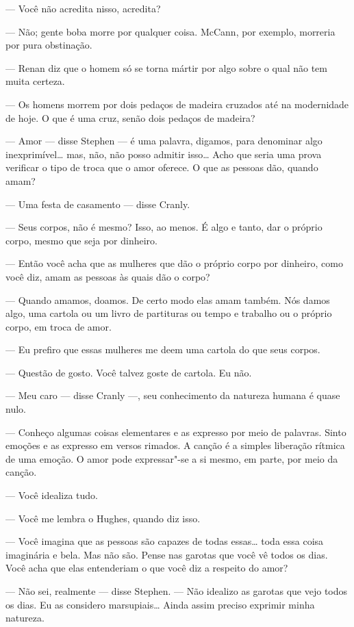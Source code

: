--- Você não acredita nisso, acredita?

--- Não; gente boba morre por qualquer coisa.  McCann, por exemplo, morreria
por pura obstinação.

--- Renan diz que o homem só se torna mártir por algo sobre o qual não tem
muita certeza.

--- Os homens morrem por dois pedaços de madeira cruzados até na modernidade de
hoje.  O que é uma cruz, senão dois pedaços de madeira?

--- Amor --- disse Stephen --- é uma palavra, digamos, para denominar algo
inexprimível\ldots{} mas, não, não posso admitir isso\ldots{}  Acho que seria uma prova
verificar o tipo de troca que o amor oferece.  O que as pessoas dão, quando
amam?

--- Uma festa de casamento --- disse Cranly.

--- Seus corpos, não é mesmo?  Isso, ao menos.  É algo e tanto, dar o próprio		
corpo, mesmo que seja por dinheiro.

--- Então você acha que as mulheres que dão o próprio corpo por dinheiro, como
você diz, amam as pessoas às quais dão o corpo?

--- Quando amamos, doamos.  De certo modo elas amam também.  Nós damos algo,
uma cartola ou um livro de partituras ou tempo e trabalho ou o próprio corpo,
em troca de amor.

--- Eu prefiro que essas mulheres me deem uma cartola do que seus corpos.

--- Questão de gosto.  Você talvez goste de cartola.  Eu não.

--- Meu caro --- disse Cranly ---, seu conhecimento da natureza humana é quase
nulo.

--- Conheço algumas coisas elementares e as expresso por meio de palavras.
Sinto emoções e as expresso em versos rimados.  A canção é a simples liberação
rítmica de uma emoção.  O amor pode expressar"-se a si mesmo, em parte, por meio
da canção.

--- Você idealiza tudo.

--- Você me lembra o Hughes, quando diz isso.

--- Você imagina que as pessoas são capazes de todas essas\ldots{}  toda essa coisa
imaginária e bela.  Mas não são.  Pense nas garotas que você vê todos os dias.
Você acha que elas entenderiam o que você diz a respeito do amor?

--- Não sei, realmente --- disse Stephen.  --- Não idealizo as garotas que vejo
todos os dias.  Eu as considero marsupiais\ldots{}  Ainda assim preciso exprimir
minha natureza.

